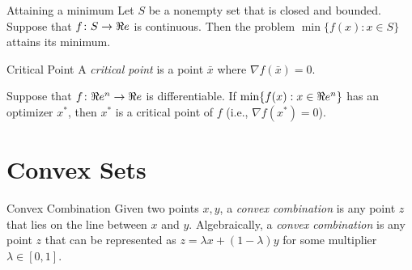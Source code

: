 \begin{theorem}{Attaining a minimum}{}
Let $S$ be a nonempty set that is closed and bounded.  Suppose that $f \colon S \to \Re e$ is continuous.  Then the problem $\min\{ f(x) : x \in S\}$ attains its minimum.
\end{theorem}


\begin{definition}{Critical Point}{}
A \emph{critical point} is a point $\bar x$ where $\nabla f(\bar x) = 0$.
\end{definition}

\begin{theorem}{}{}
Suppose that $f\colon \Re e^n \to \Re e$ is differentiable.  If $\min\{ f(x) : x \in \Re e^n\}$ has an optimizer $x^*$, then $x^*$ is a critical point of $f$ (i.e., $\nabla f(x^*) = 0$).
\end{theorem}




\section{Convex Sets}

\begin{definition}{Convex Combination}{}
Given two points $x,y$, a \emph{convex combination} is any point $z$ that lies on the line between $x$ and $y$.  Algebraically, a \emph{convex combination} is any point $z$ that can be represented as $z = \lambda x + (	1-\lambda) y $ for some multiplier $\lambda \in [0,1]$.
\end{definition}

